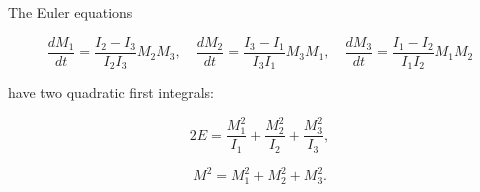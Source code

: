 The Euler equations

$$\frac{dM_1}{dt} = \frac{I_2 - I_3}{I_2 I_3} M_2 M_3, \quad \frac{dM_2}{dt} = \frac{I_3 - I_1}{I_3 I_1} M_3 M_1, \quad \frac{dM_3}{dt} = \frac{I_1 - I_2}{I_1 I_2} M_1 M_2$$

have two quadratic first integrals:

$$2E = \frac{M_1^2}{I_1} + \frac{M_2^2}{I_2} + \frac{M_3^2}{I_3},$$

$$M^2 = M_1^2 + M_2^2 + M_3^2.$$
